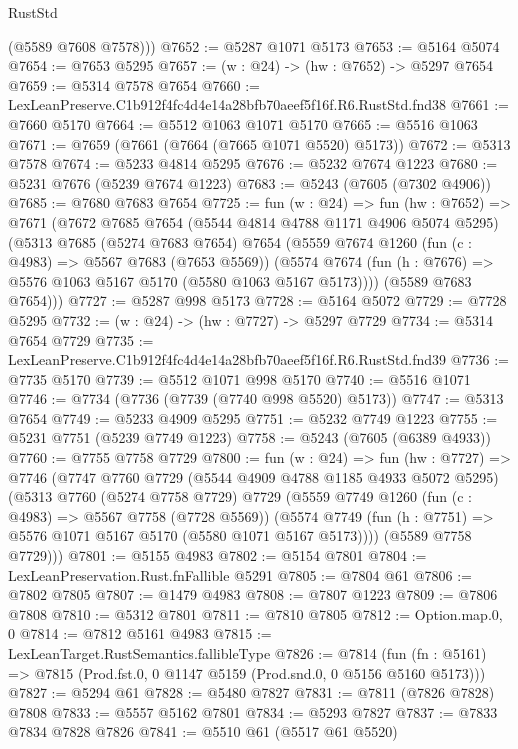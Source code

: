 \begin{lexlean}{RustStd}
\begin{coremodule}
        (@5589 @7608 @7578)))
@7652 := @5287 @1071 @5173
@7653 := @5164 @5074
@7654 := @7653 @5295
@7657 := (w : @24) -> (hw : @7652) -> @5297 @7654
@7659 := @5314 @7578 @7654
@7660 := LexLeanPreserve.C1b912f4fc4d4e14a28bfb70aeef5f16f.R6.RustStd.fnd38
@7661 := @7660 @5170
@7664 := @5512 @1063 @1071 @5170
@7665 := @5516 @1063
@7671 := @7659 (@7661 (@7664 (@7665 @1071 @5520) @5173))
@7672 := @5313 @7578
@7674 := @5233 @4814 @5295
@7676 := @5232 @7674 @1223
@7680 := @5231 @7676 (@5239 @7674 @1223)
@7683 := @5243 (@7605 (@7302 @4906))
@7685 := @7680 @7683 @7654
@7725 := fun (w : @24) =>
  fun (hw : @7652) =>
  @7671
    (@7672
      @7685
      @7654
      (@5544 @4814 @4788 @1171 @4906 @5074 @5295)
      (@5313
        @7685
        (@5274 @7683 @7654)
        @7654
        (@5559
          @7674
          @1260
          (fun (c : @4983) => @5567 @7683 (@7653 @5569))
          (@5574 @7674 (fun (h : @7676) => @5576 @1063 @5167 @5170 (@5580 @1063 @5167 @5173))))
        (@5589 @7683 @7654)))
@7727 := @5287 @998 @5173
@7728 := @5164 @5072
@7729 := @7728 @5295
@7732 := (w : @24) -> (hw : @7727) -> @5297 @7729
@7734 := @5314 @7654 @7729
@7735 := LexLeanPreserve.C1b912f4fc4d4e14a28bfb70aeef5f16f.R6.RustStd.fnd39
@7736 := @7735 @5170
@7739 := @5512 @1071 @998 @5170
@7740 := @5516 @1071
@7746 := @7734 (@7736 (@7739 (@7740 @998 @5520) @5173))
@7747 := @5313 @7654
@7749 := @5233 @4909 @5295
@7751 := @5232 @7749 @1223
@7755 := @5231 @7751 (@5239 @7749 @1223)
@7758 := @5243 (@7605 (@6389 @4933))
@7760 := @7755 @7758 @7729
@7800 := fun (w : @24) =>
  fun (hw : @7727) =>
  @7746
    (@7747
      @7760
      @7729
      (@5544 @4909 @4788 @1185 @4933 @5072 @5295)
      (@5313
        @7760
        (@5274 @7758 @7729)
        @7729
        (@5559
          @7749
          @1260
          (fun (c : @4983) => @5567 @7758 (@7728 @5569))
          (@5574 @7749 (fun (h : @7751) => @5576 @1071 @5167 @5170 (@5580 @1071 @5167 @5173))))
        (@5589 @7758 @7729)))
@7801 := @5155 @4983
@7802 := @5154 @7801
@7804 := LexLeanPreservation.Rust.fnFallible @5291
@7805 := @7804 @61
@7806 := @7802 @7805
@7807 := @1479 @4983
@7808 := @7807 @1223
@7809 := @7806 @7808
@7810 := @5312 @7801
@7811 := @7810 @7805
@7812 := Option.map.{0, 0}
@7814 := @7812 @5161 @4983
@7815 := LexLeanTarget.RustSemantics.fallibleType
@7826 := @7814
    (fun (fn : @5161) => @7815 (Prod.fst.{0, 0} @1147 @5159 (Prod.snd.{0, 0} @5156 @5160 @5173)))
@7827 := @5294 @61
@7828 := @5480 @7827
@7831 := @7811 (@7826 @7828) @7808
@7833 := @5557 @5162 @7801
@7834 := @5293 @7827
@7837 := @7833 @7834 @7828 @7826
@7841 := @5510 @61 (@5517 @61 @5520)

\end{coremodule}
\end{lexlean}
